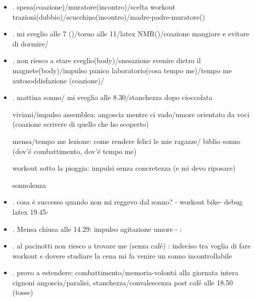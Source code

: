 \begin{itemize}
workout trazioni/bike/GP: pranzo alle 16: birra sonno quando mi metto a studiare 
cena con agnese/claudio: 

\item {}.
spesa(coazione)/muratore(incontro)/scelta workout trazioni(dubbio)/scucchino(incontro)/madre-padre-muratore()

\item {}.
mi sveglio alle 7 ()/torno alle 11/latex NMR()/coazione mangiare e evitare di dormire/

\item {}.
non riesco a stare sveglio(body)/snesazione svenire dietro il magnete(body)/impulso panico laboratorio(cosa tempo me)/tempo me autosoddisfazione (coazione)/

\item {}.
mattina sonno/ mi sveglio alle 8.30/stanchezza dopo cioccolata

viviani/impulso assemblea: angoscia mentre ci vado/umore orientato da voci
(coazione scrivere di quello che ho scoperto)

mensa/tempo me lezione: come rendere felici le mie ragazze/ biblio sonno (dov'\'e combattimento, dov'\'e tempo me)

workout sotto la pioggia: impulsi senza concretezza (e mi devo riposare)

sonnolenza
\item {}.
cosa \'e successo quando non mi reggevo dal sonno? - workout bike-
debug latex 19.45-
\item {}.
Mensa chiusa alle 14.29: impulso agitazione umore - : 
\item {}.
al pacinotti non riesco a trovare me (senza caf\'e)
: indeciso tra voglia di fare workout e dovere studiare
la cena mi fa venire un sonno incontrollabile
\item {}.
provo a estendere: combattimento/memoria-volont\'a alla giornata intera
cignoni angoscia/paralisi, stanchezza/convalescenza post caf\'e alle 18.50 (tosse)



\end{itemize}
